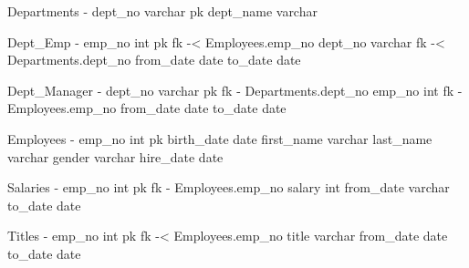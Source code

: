 Departments
-
dept_no varchar pk
dept_name varchar

Dept_Emp
-
emp_no int pk fk -< Employees.emp_no
dept_no varchar fk -< Departments.dept_no
from_date date
to_date date

Dept_Manager
-
dept_no varchar pk fk - Departments.dept_no
emp_no int fk - Employees.emp_no
from_date date
to_date date

Employees
-
emp_no int pk
birth_date date
first_name varchar
last_name varchar
gender varchar
hire_date date

Salaries
-
emp_no int pk fk - Employees.emp_no
salary int
from_date varchar
to_date date

Titles
-
emp_no int pk fk -< Employees.emp_no
title varchar
from_date date
to_date date
